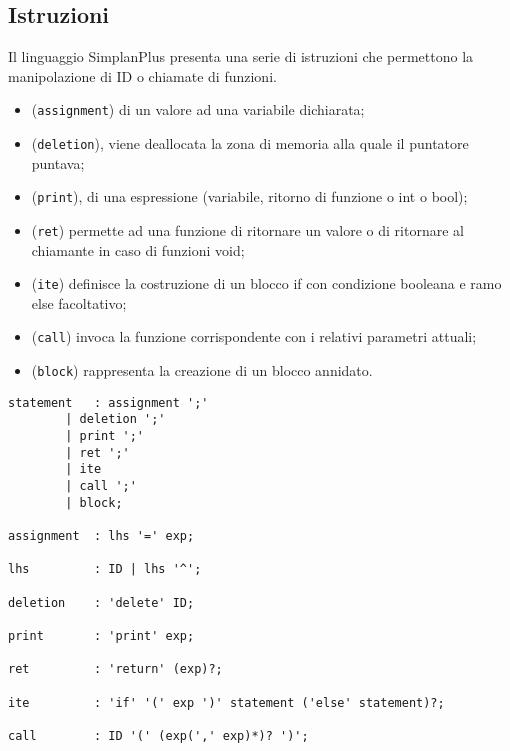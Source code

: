 \documentclass[../../main]{subfiles}
\begin{document}
\subsection{Istruzioni}\label{s:istruzioni}
Il linguaggio SimplanPlus presenta una serie di istruzioni che permettono la manipolazione di ID o chiamate di funzioni.
\begin{itemize}
    \item (\verb|assignment|) di un valore ad una variabile dichiarata;
    \item (\verb|deletion|), viene deallocata la zona di memoria alla quale il puntatore puntava;
    \item (\verb|print|), di una espressione (variabile, ritorno di funzione o int o bool);
    \item (\verb|ret|) permette ad una funzione di ritornare un valore o di ritornare al chiamante in caso di funzioni void;
    \item (\verb|ite|) definisce la costruzione di un blocco if con condizione booleana e ramo else facoltativo;
    \item (\verb|call|) invoca la funzione corrispondente con i relativi parametri attuali;
    \item (\verb|block|) rappresenta la creazione di un blocco annidato.
\end{itemize}
\begin{lstlisting}[style=antlr]
statement   : assignment ';'
        | deletion ';'
        | print ';'
        | ret ';'
        | ite
        | call ';'
        | block;

assignment  : lhs '=' exp;

lhs         : ID | lhs '^';

deletion    : 'delete' ID;

print       : 'print' exp;

ret         : 'return' (exp)?;

ite         : 'if' '(' exp ')' statement ('else' statement)?;

call        : ID '(' (exp(',' exp)*)? ')';
\end{lstlisting}
\end{document}
